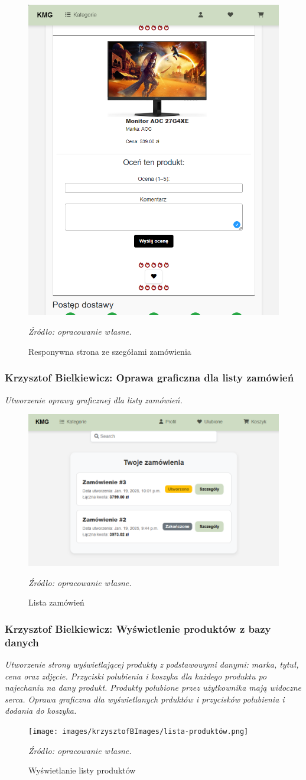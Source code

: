 \documentclass[12pt,a4paper,oneside]{article}
\theoremstyle{definition}
\numberwithin{equation}{section}
\begin{document}
\begin{figure}[H]
    \centering
    \includegraphics[width=0.5\columnwidth]{images/krzysztofBImages/szczegóły-zamówienia-respo.png}
    \caption{Responywna strona ze szegółami zamówienia}
    \emph{Źródło: opracowanie własne.}
\end{figure}

\subsubsection{Krzysztof Bielkiewicz: Oprawa graficzna dla listy zamówień}
\label{1.3.12}
\textit{Utworzenie oprawy graficznej dla listy zamówień.}

\begin{figure}[H]
    \centering
    \includegraphics[width=0.8\columnwidth]{images/krzysztofBImages/orders.png}
    \caption{Lista zamówień}
    \emph{Źródło: opracowanie własne.}
\end{figure}


\subsubsection{Krzysztof Bielkiewicz: Wyświetlenie produktów z bazy danych}
\label{1.3.13}
\textit{Utworzenie strony wyświetlającej produkty z podstawowymi danymi: marka, tytuł, cena oraz zdjęcie.
Przyciski polubienia i koszyka dla każdego produktu po najechaniu na dany produkt.
Produkty polubione przez użytkownika mają widoczne serca.
Oprawa graficzna dla wyświetlanych prduktów i przycisków polubienia i dodania do koszyka.}
\begin{figure}[H]
    \centering
    \texttt{[image: images/krzysztofBImages/lista-produktów.png]}
    \caption{Wyświetlanie listy produktów}
    \emph{Źródło: opracowanie własne.}
\end{figure}
\end{document}
